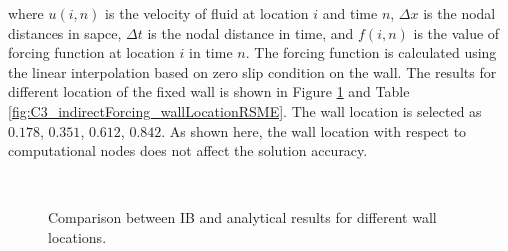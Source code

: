where $u(i, n)$ is the velocity of fluid at location $i$ and time $n$, $\Delta x$ is the nodal distances in sapce, $\Delta t$ is the nodal distance in time, and $f(i,n)$ is the value of forcing function at location $i$ in time $n$. The forcing function is calculated using the linear interpolation based on zero slip condition on the wall. The results for different location of the fixed wall is shown in Figure \ref{fig:C3_indirectForcing_wallLocation} and Table \ref{fig:C3_indirectForcing_wallLocationRSME}. The wall location is selected as $0.178$, $0.351$, $0.612$, $0.842$. As shown here, the wall location with respect to computational nodes does not affect the solution accuracy.

\begin{figure}[H]
	\centering
	\quad
	\\
	\quad
	\caption{Comparison between IB and analytical results for different wall locations.}
	\label{fig:C3_indirectForcing_wallLocation}
\end{figure}

